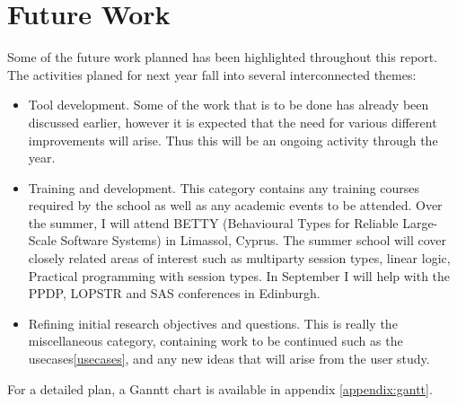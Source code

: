 \section{Future Work}
\label{sec:future}

Some of the future work planned has been highlighted throughout this report. The activities planed for next year fall into several interconnected themes:
\begin{itemize}

\item Tool development. Some of the work that is to be done has already been discussed earlier, however it is expected that the need for various different improvements will arise. Thus this will be an ongoing activity through the year.


\item Training and development. This category contains any training courses required by the school as well as any academic events to be attended. Over the summer, I will attend BETTY (Behavioural Types for Reliable Large-Scale Software Systems) in Limassol, Cyprus. The summer school will cover closely related areas of interest such as multiparty session types, linear logic, Practical programming with session types. In September I will help with the PPDP, LOPSTR and SAS conferences in Edinburgh.

\item Refining initial research objectives and questions. This is really the miscellaneous category, containing work to be continued such as the usecases\ref{usecases}, and any new ideas that will arise from the user study.
\end{itemize}

For a detailed plan, a Ganntt chart is available in appendix \ref{appendix:gantt}.
